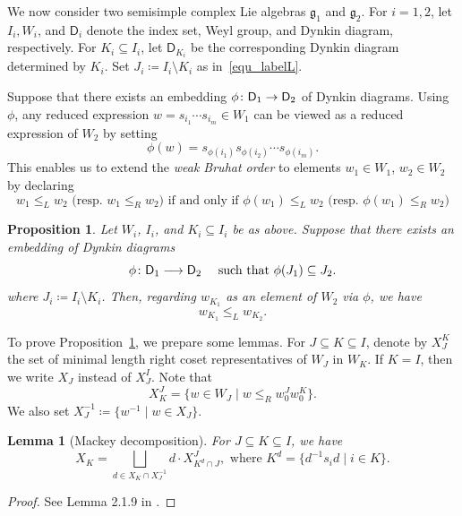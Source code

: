 \documentclass[11pt]{amsart}
\def\frak{\mathfrak}
\numberwithin{equation}{section}
\theoremstyle{plain}
\newtheorem{proposition}[theorem]{Proposition}
\newtheorem{lemma}[theorem]{Lemma}
\theoremstyle{definition}
\def\to{\mathchoice{\longrightarrow}{\rightarrow}{\rightarrow}{\rightarrow}}
\numberwithin{equation}{section}
\begin{document}
We now consider two semisimple complex Lie algebras $\frak{g}_1$ and $\frak{g}_2$. For $i = 1,2$, let $I_i, W_i$, and $\mathsf{D}_i$ denote the index set, Weyl group, and Dynkin diagram, respectively. For $K_i \subseteq I_i$, let $\mathsf{D}_{K_i}$ be the corresponding Dynkin diagram determined by ${K_i}$. Set $J_i \coloneqq I_i \setminus K_i$ as in~\eqref{equ_labelL}. 

Suppose that there exists an embedding $\phi \colon \mathsf{D}_1 \to \mathsf{D}_2$ of Dynkin diagrams. Using $\phi$, any reduced expression $w = s_{i_1}\cdots s_{i_m} \in W_1$ can be viewed as a reduced  expression of $W_2$ by setting
$$
\phi(w) = s_{\phi(i_1)} s_{\phi(i_2)} \cdots s_{\phi(i_m)}.
$$
This enables us to extend the \emph{weak Bruhat order} to elements $w_1 \in W_1$, $w_2 \in W_2$ by declaring
\begin{equation}\label{equ_weakBruhatextended}
w_1 \leq_L w_2 \mbox{ (resp. $w_1 \leq_R w_2$)} \mbox{ if and only if $\phi(w_1) \leq _L w_2$} \mbox{ (resp. $\phi(w_1) \leq_R w_2$)}
\end{equation}

\begin{proposition}\label{proposition_weakbruhat2}
Let $W_i$, $I_i$, and $K_i \subseteq I_i$ be as above. Suppose that there exists an embedding of Dynkin diagrams
$$
\phi \colon \mathsf{D}_1 \to \mathsf{D}_2 \quad \mbox{ such that $\phi(J_1) \subseteq J_2$}.
$$
where $J_i \coloneqq I_i \setminus K_i$. Then, regarding $w_{K_1}$ as an element of $W_2$ via $\phi$, we have
$$
w_{K_1} \leq_L w_{K_2}.
$$
\end{proposition}

To prove Proposition~\ref{proposition_weakbruhat2}, we prepare some lemmas. For $J \subseteq K \subseteq I$, denote by $X^K_J$ the set of minimal length right coset representatives of $W_J$ in $W_K$. If $K = I$, then we write $X_J$ instead of $X^I_J$. Note that
$$
X^J_{K} = \{ w \in W_J \mid w \leq_R w^J_0 w^K_0 \}.
$$
We also set $X_J^{-1} \coloneqq \{ w^{-1} \mid w \in X_J \}$.

\begin{lemma}[Mackey decomposition]\label{lemma_Mackeydecomposition}
For $J \subseteq K \subseteq I$, we have
$$
X_K = \bigsqcup_{d \in X_K \cap X^{-1}_J} d \cdot X^J_{K^d \cap J}, \,\, \mbox{where $K^d = \{ d^{-1} s_i d \mid i \in K \}$}.
$$
\end{lemma}

\begin{proof}
See Lemma 2.1.9 in \cite{GP00}.
\end{proof}
\end{document}
